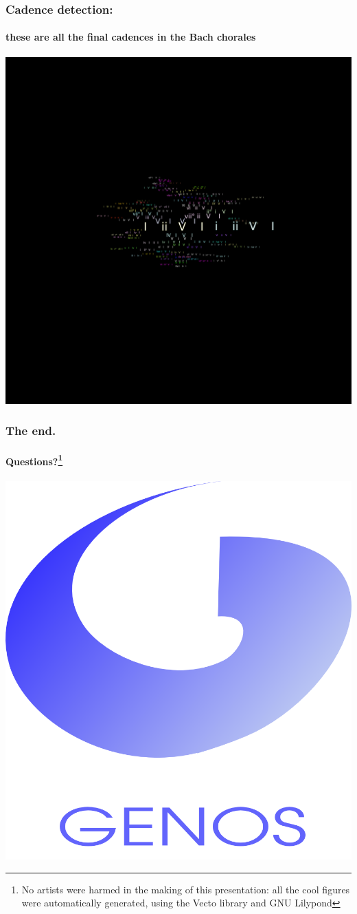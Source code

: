 \documentclass{beamer}
\begin{document}
\begin{frame}
  \frametitle{Cadence detection:}
  \framesubtitle{these are all the final cadences in the Bach chorales}
  \centering
  \addvspace{0.5em}
  \includegraphics[scale=0.3, trim = 50em 0em 0em 50em, clip]{figs/cadences}
\end{frame}



\begin{frame}
  \frametitle{The end.}
  \framesubtitle{Questions?\footnote{No artists were harmed in the making of this presentation:
    all the cool figures were automatically generated, using the
    Vecto library and GNU Lilypond}}
  \centering
  \includegraphics[scale=0.3, trim = -25em 0em 0em 0em]{figs/genos}
\end{frame}
\end{document}
